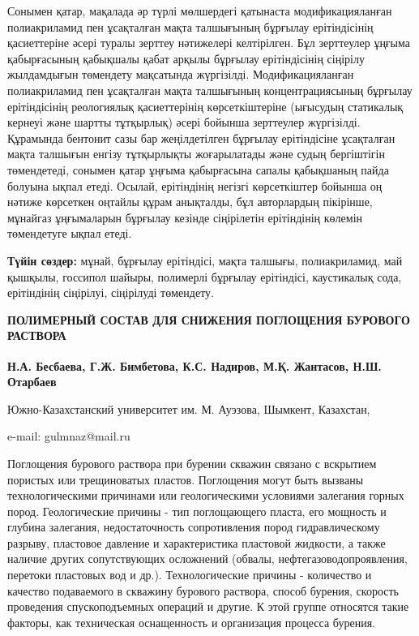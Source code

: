 Сонымен қатар, мақалада әр түрлі мөлшердегі қатынаста модификацияланған
полиакриламид пен ұсақталған мақта талшығының бұрғылау ерітіндісінің
қасиеттеріне әсері туралы зерттеу нәтижелері келтірілген. Бұл зерттеулер
ұңғыма қабырғасының қабықшалы қабат арқылы бұрғылау ерітіндісінің
сіңірілу жылдамдығын төмендету мақсатында жүргізілді. Модификацияланған
полиакриламид пен ұсақталған мақта талшығының концентрациясының бұрғылау
ерітіндісінің реологиялық қасиеттерінің көрсеткіштеріне (ығысудың
статикалық кернеуі және шартты тұтқырлық) әсері бойынша зерттеулер
жүргізілді. Құрамында бентонит сазы бар жеңілдетілген бұрғылау
ерітіндісіне ұсақталған мақта талшығын енгізу тұтқырлықты жоғарылатады
және судың бергіштігін төмендетеді, сонымен қатар ұңғыма қабырғасына
сапалы қабықшаның пайда болуына ықпал етеді. Осылай, ерітіндінің негізгі
көрсеткіштер бойынша оң нәтиже көрсеткен оңтайлы құрам анықталды, бұл
авторлардың пікірінше, мұнайгаз ұңғымаларын бұрғылау кезінде сіңірілетін
ерітіндінің көлемін төмендетуге ықпал етеді.

{\bfseries Түйін сөздер:} мұнай, бұрғылау ерітіндісі, мақта талшығы,
полиакриламид, май қышқылы, госсипол шайыры, полимерлі бұрғылау
ерітіндісі, каустикалық сода, ерітіндінің сіңірілуі, сіңірілуді
төмендету.

\begin{articleheader}
{\bfseries ПОЛИМЕРНЫЙ СОСТАВ ДЛЯ СНИЖЕНИЯ ПОГЛОЩЕНИЯ БУРОВОГО РАСТВОРА}

{\bfseries
Н.А. Бесбаева,
Г.Ж. Бимбетова\textsuperscript{\envelope },
К.С. Надиров,
М.Қ. Жантасов,
Н.Ш. Отарбаев
}
\end{articleheader}

\begin{affiliation}
Южно-Казахстанский университет им. М. Ауэзова, Шымкент, Казахстан,

e-mail: gulmnaz@mail.ru
\end{affiliation}

Поглощения бурового раствора при бурении скважин связано с вскрытием
пористых или трещиноватых пластов. Поглощения могут быть вызваны
технологическими причинами или геологическими условиями залегания горных
пород. Геологические причины - тип поглощающего пласта, его мощность и
глубина залегания, недостаточность сопротивления пород гидравлическому
разрыву, пластовое давление и характеристика пластовой жидкости, а также
наличие других сопутствующих осложнений (обвалы,
нефтегазоводопроявления, перетоки пластовых вод и др.). Технологические
причины - количество и качество подаваемого в скважину бурового
раствора, способ бурения, скорость проведения спускоподъемных операций и
другие. К этой группе относятся такие факторы, как техническая
оснащенность и организация процесса бурения.

